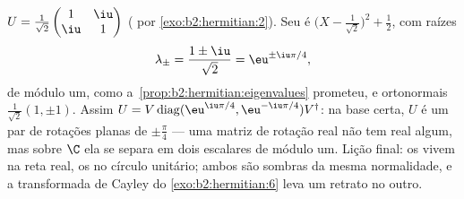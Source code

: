 \begin{example}\label{ex:b2:hermitian:unitary}
$U = \frac{1}{\sqrt2}\begin{pmatrix} 1 & \iu\\ \iu & 1
\end{pmatrix}$ ( por \cref{exo:b2:hermitian:2}). Seu
 é $\bigl(X - \frac{1}{\sqrt2}\bigr)^2
+ \frac12$, com raízes
\[
\lambda_\pm = \frac{1 \pm \iu}{\sqrt2} = \eu^{\pm\iu\pi/4},
\]
de módulo um, como a~\cref{prop:b2:hermitian:eigenvalues} prometeu, e
 ortonormais $\frac{1}{\sqrt2}(1, \pm1)$. Assim $U =
V\operatorname{diag}(\eu^{\iu\pi/4},
\eu^{-\iu\pi/4})V^\dagger$: na base certa, $U$ é um par de
rotações planas de $\pm\frac\pi4$ --- uma matriz de rotação real não tem
 real algum, mas sobre $\C$ ela se separa em dois
escalares de módulo um. Lição final: os   vivem na
reta real, os  no círculo unitário; ambos são
sombras da mesma normalidade, e a transformada de Cayley do
\cref{exo:b2:hermitian:6} leva um retrato no outro.
\end{example}

